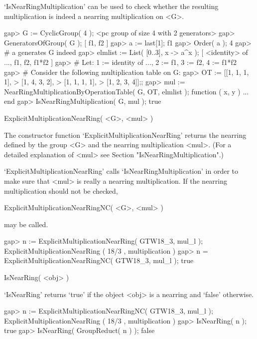 `IsNearRingMultiplication' can be used to check whether the resulting multiplication
is indeed a nearring multiplication on <G>.

\beginexample
    gap> G := CyclicGroup( 4 );            
    <pc group of size 4 with 2 generators>
    gap> GeneratorsOfGroup( G );
    [ f1, f2 ]
    gap> a := last[1];
    f1
    gap> Order( a );
    4
    gap> # a generates G indeed
    gap> elmlist := List( [0..3], x -> a^x );
    [ <identity> of ..., f1, f2, f1*f2 ]
    gap> # Let:  1 := identity of ..., 2 := f1, 3 := f2, 4 := f1*f2
    gap> # Consider the following multiplication table on G:
    gap> OT := [[1, 1, 1, 1],
    > [1, 4, 3, 2],                                                   
    > [1, 1, 1, 1],
    > [1, 2, 3, 4]];;
        gap> mul := NearRingMultiplicationByOperationTable( G, OT, elmlist );
    function ( x, y ) ... end
    gap> IsNearRingMultiplication( G, mul );
    true
\endexample



\>ExplicitMultiplicationNearRing( <G>, <mul> )

The constructor function `ExplicitMultiplicationNearRing' returns the nearring 
defined by the group <G> and the nearring multiplication <mul>.
(For a detailed explanation of <mul> see Section "IsNearRingMultiplication".)

`ExplicitMultiplicationNearRing' calls
`Is\-Near\-Ring\-Mul\-ti\-pli\-ca\-tion' in order to make sure that
<mul> is really a nearring multiplication. If the nearring
multiplication should not be checked,

\>ExplicitMultiplicationNearRingNC( <G>, <mul> )

may be called.

\beginexample
    gap> n := ExplicitMultiplicationNearRing( GTW18_3, mul_l );
    ExplicitMultiplicationNearRing ( 18/3 , multiplication )
    gap> n = ExplicitMultiplicationNearRingNC( GTW18_3, mul_l );
    true
\endexample

\>IsNearRing( <obj> )

`IsNearRing' returns `true' if the object <obj> is a nearring 
and `false' otherwise. 

\beginexample
    gap> n := ExplicitMultiplicationNearRingNC( GTW18_3, mul_l );
    ExplicitMultiplicationNearRing ( 18/3 , multiplication )
    gap> IsNearRing( n );                                       
    true
    gap> IsNearRing( GroupReduct( n ) );
    false
\endexample

